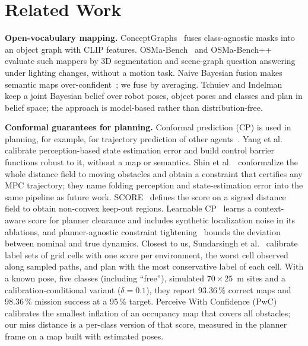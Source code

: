 \documentclass[conference]{IEEEtran}
\theoremstyle{definition}
\begin{document}
\section{Related Work}

\textbf{Open-vocabulary mapping.} ConceptGraphs~\cite{conceptgraphs} fuses class-agnostic masks into an object graph
with CLIP features. OSMa-Bench~\cite{osmabench} and OSMa-Bench++~\cite{osmabenchpp} evaluate such mappers by 3D
segmentation and scene-graph question answering under lighting changes, without a motion task. Naive Bayesian fusion
makes semantic maps over-confident~\cite{overconf}; we fuse by averaging. Tchuiev and Indelman~\cite{tchuiev} keep a
joint Bayesian belief over robot poses, object poses and classes and plan in belief space; the approach is
model-based rather than distribution-free.

\textbf{Conformal guarantees for planning.} Conformal prediction (CP) is used in planning, for example, for trajectory
prediction of other agents~\cite{lindemann}. Yang et al.~\cite{yang2023} calibrate perception-based state estimation error and
build control barrier functions robust to it, without a map or semantics. Shin et al.~\cite{shin2026} conformalize the
whole distance field to moving obstacles and obtain a constraint that certifies any MPC trajectory; they name folding
perception and state-estimation error into the same pipeline as future work. SCORE~\cite{score} defines the score on a
signed distance field to obtain non-convex keep-out regions. Learnable CP~\cite{learnablecp} learns a context-aware
score for planner clearance and includes synthetic localization noise in its ablations, and planner-agnostic constraint
tightening~\cite{tightening} bounds the deviation between nominal and true dynamics. Closest to us, Sundarsingh et
al.~\cite{sundarsingh} calibrate label sets of grid cells with one score per environment, the worst cell observed along
sampled paths, and plan with the most conservative label of each cell. With a known pose, five classes (including
``free''), simulated $70\times25$~m sites and a calibration-conditional variant ($\delta = 0.1$), they report 93.36\,\%
correct maps and 98.36\,\% mission success at a 95\,\% target. Perceive With Confidence (PwC)~\cite{pwc} calibrates the
smallest inflation of an occupancy map that covers all obstacles; our miss distance is a per-class version of that score,
measured in the planner frame on a map built with estimated poses.
\end{document}
